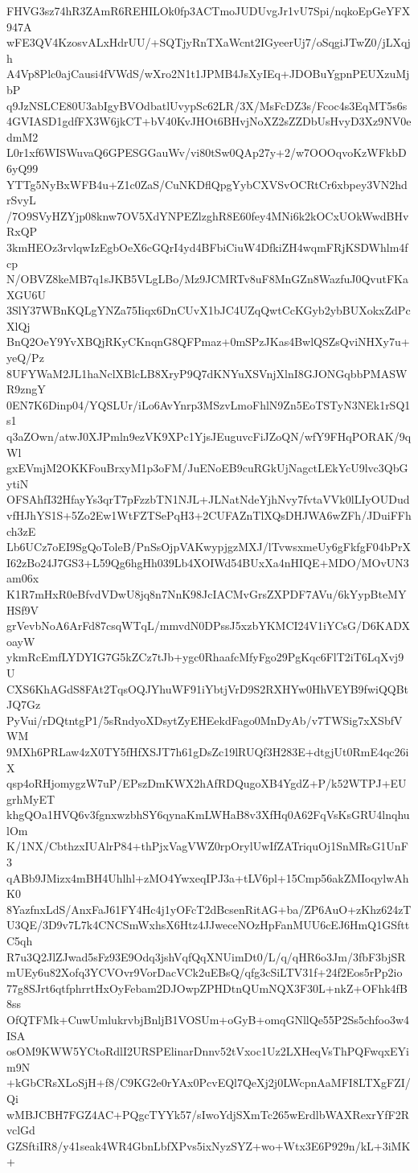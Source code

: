 FHVG3sz74hR3ZAmR6REHILOk0fp3ACTmoJUDUvgJr1vU7Spi/nqkoEpGeYFX947A
wFE3QV4KzosvALxHdrUU/+SQTjyRnTXaWcnt2IGyeerUj7/oSqgiJTwZ0/jLXqjh
A4Vp8Plc0ajCausi4fVWdS/wXro2N1t1JPMB4JsXyIEq+JDOBuYgpnPEUXzuMjbP
q9JzNSLCE80U3abIgyBVOdbatlUvypSc62LR/3X/MsFcDZ3s/Fcoc4s3EqMT5s6s
4GVIASD1gdfFX3W6jkCT+bV40KvJHOt6BHvjNoXZ2sZZDbUsHvyD3Xz9NV0edmM2
L0r1xf6WISWuvaQ6GPESGGauWv/vi80tSw0QAp27y+2/w7OOOqvoKzWFkbD6yQ99
YTTg5NyBxWFB4u+Z1c0ZaS/CuNKDflQpgYybCXVSvOCRtCr6xbpey3VN2hdrSvyL
/7O9SVyHZYjp08knw7OV5XdYNPEZlzghR8E60fey4MNi6k2kOCxUOkWwdBHvRxQP
3kmHEOz3rvlqwIzEgbOeX6cGQrI4yd4BFbiCiuW4DfkiZH4wqmFRjKSDWhlm4fcp
N/OBVZ8keMB7q1sJKB5VLgLBo/Mz9JCMRTv8uF8MnGZn8WazfuJ0QvutFKaXGU6U
3SlY37WBnKQLgYNZa75Iiqx6DnCUvX1bJC4UZqQwtCcKGyb2ybBUXokxZdPcXlQj
BnQ2OeY9YvXBQjRKyCKnqnG8QFPmaz+0mSPzJKas4BwlQSZsQviNHXy7u+yeQ/Pz
8UFYWaM2JL1haNclXBlcLB8XryP9Q7dKNYuXSVnjXlnI8GJONGqbbPMASWR9zngY
0EN7K6Dinp04/YQSLUr/iLo6AvYnrp3MSzvLmoFhlN9Zn5EoTSTyN3NEk1rSQ1s1
q3aZOwn/atwJ0XJPmln9ezVK9XPc1YjsJEuguvcFiJZoQN/wfY9FHqPORAK/9qWl
gxEVmjM2OKKFouBrxyM1p3oFM/JuENoEB9cuRGkUjNagctLEkYcU9lvc3QbGytiN
OFSAhfI32HfayYs3qrT7pFzzbTN1NJL+JLNatNdeYjhNvy7fvtaVVk0lLIyOUDud
vfHJhYS1S+5Zo2Ew1WtFZTSePqH3+2CUFAZnTlXQsDHJWA6wZFh/JDuiFFhch3zE
Lb6UCz7oEI9SgQoToleB/PnSsOjpVAKwypjgzMXJ/lTvwsxmeUy6gFkfgF04bPrX
I62zBo24J7GS3+L59Qg6hgHh039Lb4XOIWd54BUxXa4nHIQE+MDO/MOvUN3am06x
K1R7mHxR0eBfvdVDwU8jq8n7NnK98JcIACMvGrsZXPDF7AVu/6kYypBteMYHSf9V
grVevbNoA6ArFd87csqWTqL/mmvdN0DPssJ5xzbYKMCI24V1iYCsG/D6KADXoayW
ykmRcEmfLYDYIG7G5kZCz7tJb+ygc0RhaafcMfyFgo29PgKqc6FlT2iT6LqXvj9U
CXS6KhAGdS8FAt2TqsOQJYhuWF91iYbtjVrD9S2RXHYw0HhVEYB9fwiQQBtJQ7Gz
PyVui/rDQtntgP1/5sRndyoXDsytZyEHEekdFago0MnDyAb/v7TWSig7xXSbfVWM
9MXh6PRLaw4zX0TY5fHfXSJT7h61gDsZc19lRUQf3H283E+dtgjUt0RmE4qc26iX
qsp4oRHjomygzW7uP/EPszDmKWX2hAfRDQugoXB4YgdZ+P/k52WTPJ+EUgrhMyET
khgQOa1HVQ6v3fgnxwzbhSY6qynaKmLWHaB8v3XfHq0A62FqVsKsGRU4lnqhulOm
K/1NX/CbthzxIUAlrP84+thPjxVagVWZ0rpOrylUwIfZATriquOj1SnMRsG1UnF3
qABb9JMizx4mBH4Uhlhl+zMO4YwxeqIPJ3a+tLV6pl+15Cmp56akZMIoqylwAhK0
8YazfnxLdS/AnxFaJ61FY4Hc4j1yOFcT2dBcsenRitAG+ba/ZP6AuO+zKhz624zT
U3QE/3D9v7L7k4CNCSmWxhsX6Htz4JJweceNOzHpFanMUU6cEJ6HmQ1GSfttC5qh
R7u3Q2JlZJwad5sFz93E9Odq3jshVqfQqXNUimDt0/L/q/qHR6o3Jm/3fbF3bjSR
mUEy6u82Xofq3YCVOvr9VorDacVCk2uEBsQ/qfg3cSiLTV31f+24f2Eos5rPp2io
77g8SJrt6qtfphrrtHxOyFebam2DJOwpZPHDtnQUmNQX3F30L+nkZ+OFhk4fB8ss
OfQTFMk+CuwUmlukrvbjBnljB1VOSUm+oGyB+omqGNllQe55P2Ss5chfoo3w4ISA
osOM9KWW5YCtoRdlI2URSPElinarDnnv52tVxoc1Uz2LXHeqVsThPQFwqxEYim9N
+kGbCRsXLoSjH+f8/C9KG2e0rYAx0PcvEQl7QeXj2j0LWcpnAaMFI8LTXgFZI/Qi
wMBJCBH7FGZ4AC+PQgcTYYk57/sIwoYdjSXmTc265wErdlbWAXRexrYfF2RvclGd
GZSftiIR8/y41seak4WR4GbnLbfXPvs5ixNyzSYZ+wo+Wtx3E6P929n/kL+3iMK+
